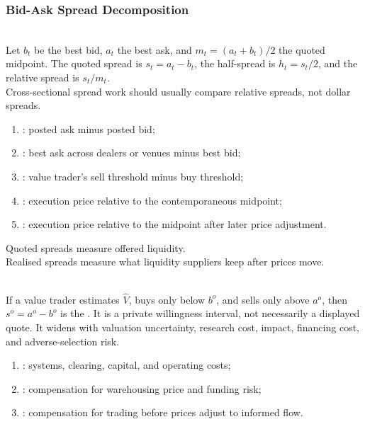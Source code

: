 \subsubsection{Bid-Ask Spread Decomposition}

\begin{definition} \\
Let $b_t$ be the best bid, $a_t$ the best ask, and $m_t=(a_t+b_t)/2$ the quoted midpoint. The quoted spread is $s_t=a_t-b_t$, the half-spread is $h_t=s_t/2$, and the relative spread is $s_t/m_t$.\\
Cross-sectional spread work should usually compare relative spreads, not dollar spreads.
\end{definition}

\begin{taxonomy} 
\begin{enumerate}[label=\roman*.]
\setlength{\itemsep}{0pt}
\item {}: posted ask minus posted bid;
\item {}: best ask across dealers or venues minus best bid;
\item {}: value trader's sell threshold minus buy threshold;
\item {}: execution price relative to the contemporaneous midpoint;
\item {}: execution price relative to the midpoint after later price adjustment.
\end{enumerate}
Quoted spreads measure offered liquidity.\\
Realised spreads measure what liquidity suppliers keep after prices move.
\end{taxonomy}

\begin{definition} \\
If a value trader estimates $\widehat{V}$, buys only below $b^o$, and sells only above $a^o$, then $s^o=a^o-b^o$ is the . It is a private willingness interval, not necessarily a displayed quote. It widens with valuation uncertainty, research cost, impact, financing cost, and adverse-selection risk.
\end{definition}

\begin{taxonomy} 
\begin{enumerate}[label=\roman*.]
\setlength{\itemsep}{0pt}
\item {}: systems, clearing, capital, and operating costs;
\item {}: compensation for warehousing price and funding risk;
\item {}: compensation for trading before prices adjust to informed flow.
\end{enumerate}
\end{taxonomy}

